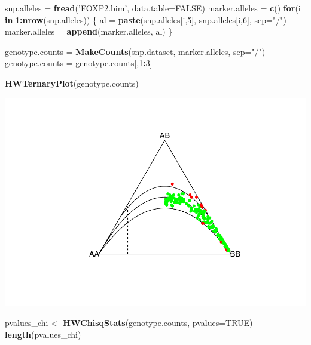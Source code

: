 \documentclass[
]{article}
\newenvironment{Shaded}{\begin{snugshade}}{\end{snugshade}}
\newcommand{\ControlFlowTok}[1]{\textcolor[rgb]{0.13,0.29,0.53}{\textbf{#1}}}
\newcommand{\DataTypeTok}[1]{\textcolor[rgb]{0.13,0.29,0.53}{#1}}
\newcommand{\DecValTok}[1]{\textcolor[rgb]{0.00,0.00,0.81}{#1}}
\newcommand{\KeywordTok}[1]{\textcolor[rgb]{0.13,0.29,0.53}{\textbf{#1}}}
\newcommand{\NormalTok}[1]{#1}
\newcommand{\OperatorTok}[1]{\textcolor[rgb]{0.81,0.36,0.00}{\textbf{#1}}}
\newcommand{\OtherTok}[1]{\textcolor[rgb]{0.56,0.35,0.01}{#1}}
\newcommand{\StringTok}[1]{\textcolor[rgb]{0.31,0.60,0.02}{#1}}
\begin{document}
\begin{Shaded}
\begin{Highlighting}[]
\NormalTok{snp.alleles =}\StringTok{ }\KeywordTok{fread}\NormalTok{(}\StringTok{'FOXP2.bim'}\NormalTok{, }\DataTypeTok{data.table=}\OtherTok{FALSE}\NormalTok{)}
\NormalTok{marker.alleles =}\StringTok{ }\KeywordTok{c}\NormalTok{()}
\ControlFlowTok{for}\NormalTok{(i }\ControlFlowTok{in} \DecValTok{1}\OperatorTok{:}\KeywordTok{nrow}\NormalTok{(snp.alleles)) \{}
\NormalTok{  al =}\StringTok{ }\KeywordTok{paste}\NormalTok{(snp.alleles[i,}\DecValTok{5}\NormalTok{], snp.alleles[i,}\DecValTok{6}\NormalTok{], }\DataTypeTok{sep=}\StringTok{"/"}\NormalTok{) }
\NormalTok{  marker.alleles =}\StringTok{ }\KeywordTok{append}\NormalTok{(marker.alleles, al)}
\NormalTok{\}}

\NormalTok{genotype.counts =}\StringTok{ }\KeywordTok{MakeCounts}\NormalTok{(snp.dataset, marker.alleles, }\DataTypeTok{sep=}\StringTok{"/"}\NormalTok{)}
\NormalTok{genotype.counts =}\StringTok{ }\NormalTok{genotype.counts[,}\DecValTok{1}\OperatorTok{:}\DecValTok{3}\NormalTok{]}

\KeywordTok{HWTernaryPlot}\NormalTok{(genotype.counts)}
\end{Highlighting}
\end{Shaded}

\includegraphics{P032020_LD_files/figure-latex/3rd-1.pdf}

\begin{Shaded}
\begin{Highlighting}[]
\NormalTok{pvalues_chi <-}\StringTok{ }\KeywordTok{HWChisqStats}\NormalTok{(genotype.counts, }\DataTypeTok{pvalues=}\OtherTok{TRUE}\NormalTok{)}
\KeywordTok{length}\NormalTok{(pvalues_chi)}
\end{Highlighting}
\end{Shaded}
\end{document}
